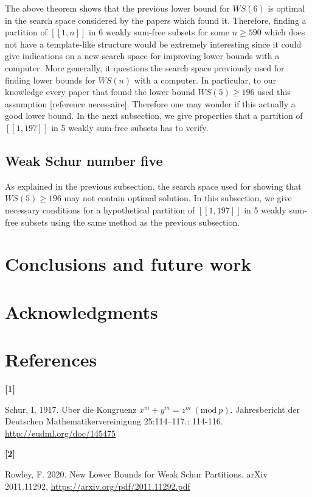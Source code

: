 \documentclass{article}
\newtheorem{computational theorem}{Computational Theorem}[section]
\begin{document}
\par
The above theorem shows that the previous lower bound for \(WS(6)\) is optimal in the search space considered by the papers which found it. 
Therefore, finding a partition of \([\![1,n]\!]\) in 6 weakly sum-free subsets for some \(n \geq 590\) which does not have a template-like structure 
would be extremely interesting since it could give indications on a new search space for improving lower bounds with a computer. More generally, 
it questions the search space previously used for finding lower bounds for \(WS(n)\) with a computer. In particular, to our knowledge every paper 
that found the lower bound \(WS(5) \geq 196\) used this assumption [reference necessaire]. Therefore one may wonder if this actually a good lower 
bound. In the next subsection, we give properties that a partition of \([\![1,197]\!]\) in 5 weakly sum-free subsets has to verify.


\subsection{Weak Schur number five}
As explained in the previous subsection, the search space used for showing that  \(WS(5) \geq 196\) may not contain optimal solution. In this subsection, 
we give necessary conditions for a hypothetical partition of \([\![1,197]\!]\) in 5 weakly sum-free subsets using the same method as the previous subsection.



\section{Conclusions and future work}



\section{Acknowledgments}



\section{References}

\hypertarget{label1}{\textbf{[1]}} Schur, I. 1917. Uber die Kongruenz \(x^m + y^m = z^m~(\text{mod}~p)\). Jahresbericht der 
Deutschen Mathematikervereinigung 25:114–117.: 114-116. \url{http://eudml.org/doc/145475}

\hypertarget{label2}{\textbf{[2]}} Rowley, F. 2020. New Lower Bounds for Weak Schur Partitions. arXiv 2011.11292, 
\url{https://arxiv.org/pdf/2011.11292.pdf}
\end{document}
